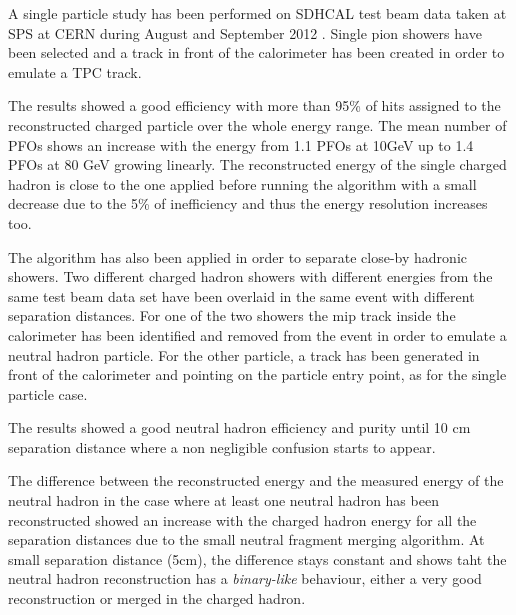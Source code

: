 \documentclass[cits]{JINST}
\begin{document}
A single particle study has been performed on SDHCAL test beam data taken at SPS at CERN during August and September 2012 \cite{sdhcal-paper}. Single pion showers have been selected and a track in front of the calorimeter has been created in order to emulate a TPC track.

The results showed a good efficiency with more than 95\% of hits assigned to the reconstructed charged particle over the whole energy range. The mean number of PFOs shows an increase with the energy from 1.1 PFOs at 10GeV up to 1.4 PFOs at 80 GeV growing linearly. The reconstructed energy of the single charged hadron is close to the one applied before running the algorithm with a small decrease due to the 5\% of inefficiency and thus the energy resolution increases too.

The algorithm has also been applied in order to separate close-by hadronic showers. Two different charged hadron showers with different energies from the same test beam data set have been overlaid in the same event with different separation distances. For one of the two showers the mip track inside the calorimeter has been identified and removed from the event in order to emulate a neutral hadron particle. For the other particle, a track has been generated in front of the calorimeter and pointing on the particle entry point, as for the single particle case. 

The results showed a good neutral hadron efficiency and purity until 10 cm separation distance where a non negligible confusion starts to appear. 

The difference between the reconstructed energy and the measured energy of the neutral hadron in the case where at least one neutral hadron has been reconstructed showed an increase with the charged hadron energy for all the separation distances due to the small neutral fragment merging algorithm. At small separation distance (5cm), the difference stays constant and shows taht the neutral hadron reconstruction has a \textit{binary-like} behaviour, either a very good reconstruction or merged in the charged hadron.
\end{document}
